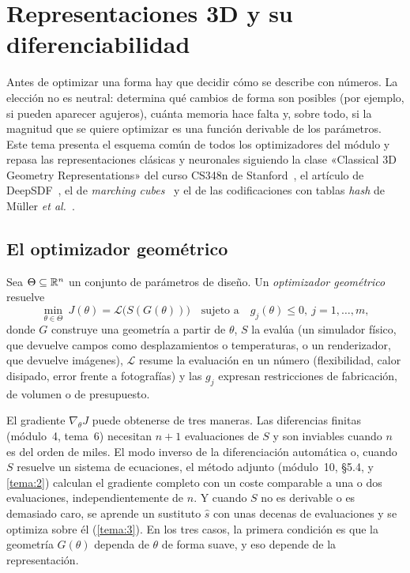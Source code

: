 \chapter{Representaciones 3D y su diferenciabilidad}
\label{tema:1}

Antes de optimizar una forma hay que decidir cómo se describe con números. La elección no es neutral: determina qué cambios de forma son posibles (por ejemplo, si pueden aparecer agujeros), cuánta memoria hace falta y, sobre todo, si la magnitud que se quiere optimizar es una función derivable de los parámetros. Este tema presenta el esquema común de todos los optimizadores del módulo y repasa las representaciones clásicas y neuronales siguiendo la clase «Classical 3D Geometry Representations» del curso CS348n de Stanford~\cite{cs348n}, el artículo de DeepSDF~\cite{deepsdf}, el de \emph{marching cubes}~\cite{mc} y el de las codificaciones con tablas \emph{hash} de Müller \emph{et al.}~\cite{ingp}.

\section{El optimizador geométrico}

\begin{definicion}\label{def:opt-geom}
Sea $\Theta\subseteq\mathbb{R}^n$ un conjunto de parámetros de diseño. Un \emph{optimizador geométrico} resuelve
\[
\min_{\theta\in\Theta}\ J(\theta)=\mathcal{L}\bigl(S(G(\theta))\bigr)\quad\text{sujeto a}\quad g_j(\theta)\le 0,\ j=1,\dots,m,
\]
donde $G$ construye una geometría a partir de $\theta$, $S$ la evalúa (un simulador físico, que devuelve campos como desplazamientos o temperaturas, o un renderizador, que devuelve imágenes), $\mathcal{L}$ resume la evaluación en un número (flexibilidad, calor disipado, error frente a fotografías) y las $g_j$ expresan restricciones de fabricación, de volumen o de presupuesto.
\end{definicion}

\addtocounter{figure}{1}%

El gradiente $\nabla_\theta J$ puede obtenerse de tres maneras. Las diferencias finitas (módulo~4, tema~6) necesitan $n+1$ evaluaciones de $S$ y son inviables cuando $n$ es del orden de miles. El modo inverso de la diferenciación automática o, cuando $S$ resuelve un sistema de ecuaciones, el método adjunto (módulo~10, §5.4, y \cref{tema:2}) calculan el gradiente completo con un coste comparable a una o dos evaluaciones, independientemente de $n$. Y cuando $S$ no es derivable o es demasiado caro, se aprende un sustituto $\hat s$ con unas decenas de evaluaciones y se optimiza sobre él (\cref{tema:3}). En los tres casos, la primera condición es que la geometría $G(\theta)$ dependa de $\theta$ de forma suave, y eso depende de la representación.

